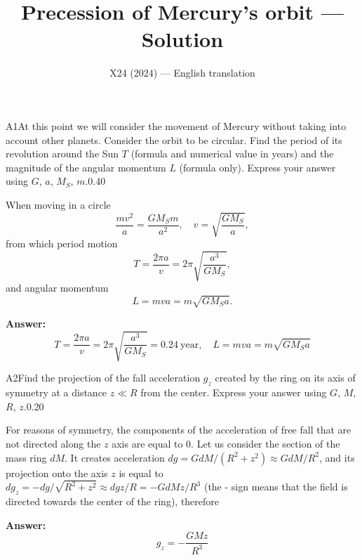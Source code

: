 \documentclass[11pt,a4paper]{article}
\title{\textbf{Precession of Mercury's orbit --- Solution}}
\author{\normalsize X24 (2024) — English translation}
\date{}
\begin{document}
\maketitle\vspace{-0.5em}
\begin{solcard}{A1}{At this point we will consider the movement of Mercury without taking into account other planets. Consider the orbit to be circular. Find the period of its revolution around the Sun $T$ (formula and numerical value in years) and the magnitude of the angular momentum $L$ (formula only). Express your answer using $G$, $a$, $M_S$, $m$.}{0.40}

When moving in a circle $$ \frac{m v^2}{a} = \frac{GM_S m}{a^2}, \quad  v = \sqrt{\frac{G M_S}{a}}, $$from which period motion $$ T = \frac{2 \pi a}{v} = 2\pi \sqrt{\frac{a^3}{G M_S}}, $$and angular momentum $$ L= m v a = m \sqrt{G M_S a}. $$

\par\smallskip\noindent\textbf{Answer:} $$ T = \frac{2 \pi a}{v} = 2\pi \sqrt{\frac{a^3}{G M_S}} = 0.24 ~\text{year}, \quad L= m v a = m \sqrt{G M_S a} $$
\end{solcard}

\begin{solcard}{A2}{Find the projection of the fall acceleration $g_z$ created by the ring on its axis of symmetry at a distance $z \ll R$ from the center. Express your answer using $G$, $M$, $R$, $z$.}{0.20}

For reasons of symmetry, the components of the acceleration of free fall that are not directed along the $z$ axis are equal to 0. Let us consider the section of the mass ring $dM$. It creates acceleration $dg = G dM/(R^2 + z^2) \approx GdM/R^2$, and its projection onto the axis $z$ is equal to $dg_z = - dg /\sqrt{R^2 + z^2} \approx dg z/R =  -G dM z/R^3$ (the - sign means that the field is directed towards the center of the ring), therefore

\par\smallskip\noindent\textbf{Answer:} $$ g_z = -  \frac{G M z }{R^3} $$
\end{solcard}
\end{document}
